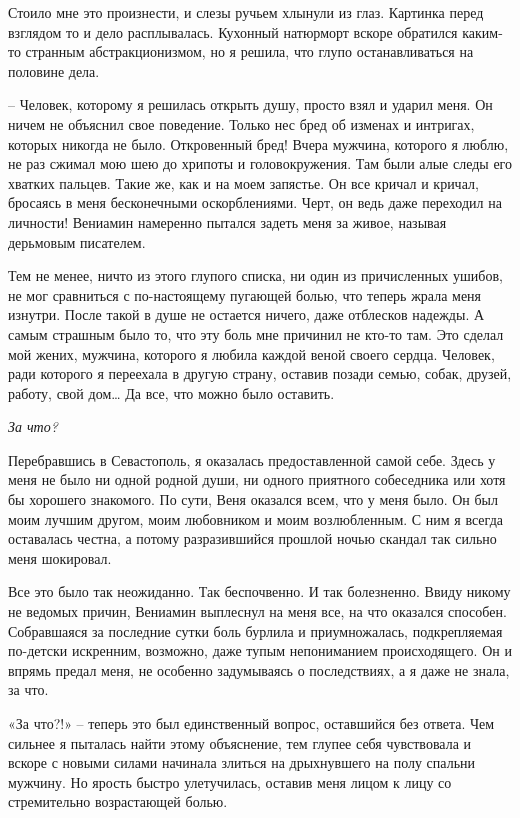 \documentclass[
]{book}
\begin{document}
Стоило мне это произнести, и слезы ручьем хлынули из глаз. Картинка перед взглядом то и дело расплывалась. Кухонный натюрморт вскоре обратился каким-то странным абстракционизмом, но я решила, что глупо останавливаться на половине дела.

-- Человек, которому я решилась открыть душу, просто взял и ударил меня. Он ничем не объяснил свое поведение. Только нес бред об изменах и интригах, которых никогда не было. Откровенный бред! Вчера мужчина, которого я люблю, не раз сжимал мою шею до хрипоты и головокружения. Там были алые следы его хватких пальцев. Такие же, как и на моем запястье. Он все кричал и кричал, бросаясь в меня бесконечными оскорблениями. Черт, он ведь даже переходил на личности! Вениамин намеренно пытался задеть меня за живое, называя дерьмовым писателем.

Тем не менее, ничто из этого глупого списка, ни один из причисленных ушибов, не мог сравниться с по-настоящему пугающей болью, что теперь жрала меня изнутри. После такой в душе не остается ничего, даже отблесков надежды. А самым страшным было то, что эту боль мне причинил не кто-то там. Это сделал мой жених, мужчина, которого я любила каждой веной своего сердца. Человек, ради которого я переехала в другую страну, оставив позади семью, собак, друзей, работу, свой дом\ldots{} Да все, что можно было оставить.

\emph{За что?}

Перебравшись в Севастополь, я оказалась предоставленной самой себе. Здесь у меня не было ни одной родной души, ни одного приятного собеседника или хотя бы хорошего знакомого. По сути, Веня оказался всем, что у меня было. Он был моим лучшим другом, моим любовником и моим возлюбленным. С ним я всегда оставалась честна, а потому разразившийся прошлой ночью скандал так сильно меня шокировал.

Все это было так неожиданно. Так беспочвенно. И так болезненно. Ввиду никому не ведомых причин, Вениамин выплеснул на меня все, на что оказался способен. Собравшаяся за последние сутки боль бурлила и приумножалась, подкрепляемая по-детски искренним, возможно, даже тупым непониманием происходящего. Он и впрямь предал меня, не особенно задумываясь о последствиях, а я даже не знала, за что.

«За что?!» -- теперь это был единственный вопрос, оставшийся без ответа. Чем сильнее я пыталась найти этому объяснение, тем глупее себя чувствовала и вскоре с новыми силами начинала злиться на дрыхнувшего на полу спальни мужчину. Но ярость быстро улетучилась, оставив меня лицом к лицу со стремительно возрастающей болью.
\end{document}
